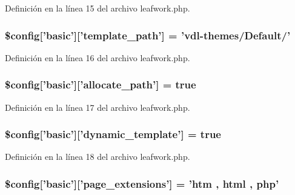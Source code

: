 Definición en la línea 15 del archivo leafwork.\-php.

\hypertarget{config_2leafwork_8php_acf8244dece93624571d1c2dd72002bae}{
\subsubsection[{\$config}]{\setlength{\rightskip}{0pt plus 5cm}\${\bf config}\mbox{[}'basic'\mbox{]}\mbox{[}'template\-\_\-path'\mbox{]} = 'vdl-\/themes/Default/'}}\label{config_2leafwork_8php_acf8244dece93624571d1c2dd72002bae}


Definición en la línea 16 del archivo leafwork.\-php.

\hypertarget{config_2leafwork_8php_ad09db026139844b4edfe9943623f462b}{
\subsubsection[{\$config}]{\setlength{\rightskip}{0pt plus 5cm}\${\bf config}\mbox{[}'basic'\mbox{]}\mbox{[}'allocate\-\_\-path'\mbox{]} = true}}\label{config_2leafwork_8php_ad09db026139844b4edfe9943623f462b}


Definición en la línea 17 del archivo leafwork.\-php.

\hypertarget{config_2leafwork_8php_a264786660a8c9560ccaefade1ac3d3a9}{
\subsubsection[{\$config}]{\setlength{\rightskip}{0pt plus 5cm}\${\bf config}\mbox{[}'basic'\mbox{]}\mbox{[}'dynamic\-\_\-template'\mbox{]} = true}}\label{config_2leafwork_8php_a264786660a8c9560ccaefade1ac3d3a9}


Definición en la línea 18 del archivo leafwork.\-php.

\hypertarget{config_2leafwork_8php_aac461bcedf0fc8f78267555706c7f3e9}{
\subsubsection[{\$config}]{\setlength{\rightskip}{0pt plus 5cm}\${\bf config}\mbox{[}'basic'\mbox{]}\mbox{[}'page\-\_\-extensions'\mbox{]} = 'htm , {\bf html} , php'}}\label{config_2leafwork_8php_aac461bcedf0fc8f78267555706c7f3e9}


